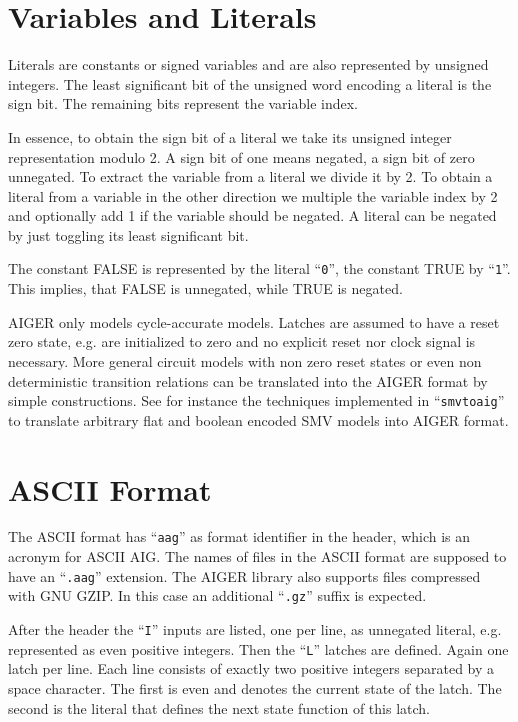 \documentclass[10pt]{llncs}
\begin{document}
\section{Variables and Literals}

  Literals are constants or signed variables and are also represented by
  unsigned integers.  The least significant bit of the unsigned word
  encoding a literal is the sign bit.  The remaining bits represent the
  variable index.
  
  In essence, to obtain the sign bit of a literal we take its unsigned
  integer representation modulo 2.  A sign bit of one means negated, a sign
  bit of zero unnegated.  To extract the variable from a literal we divide
  it by 2.  To obtain a literal from a variable in the other direction we
  multiple the variable index by 2 and optionally add 1 if the variable
  should be negated.   A literal can be negated by just toggling its least
  significant bit.
  
  The constant FALSE is represented by the literal ``\texttt{0}'', the constant TRUE by
  ``\texttt{1}''.  This implies, that FALSE is unnegated, while TRUE is negated.

  AIGER only models cycle-accurate models.  Latches are assumed to have a
  reset zero state, e.g. are initialized to zero and no explicit reset nor
  clock signal is necessary.  More general circuit models with non zero
  reset states or even non deterministic transition relations can be
  translated into the AIGER format by simple constructions.  See for
  instance the techniques implemented in ``\texttt{smvtoaig}'' to translate 
  arbitrary flat and boolean encoded SMV models into AIGER format.

\section{ASCII Format}
  
  The ASCII format has ``\texttt{aag}'' as format identifier in the header, which is an
  acronym for ASCII AIG.  The names of files in the ASCII format are
  supposed to have an ``\texttt{.aag}''  extension.  The AIGER library also supports
  files compressed with GNU GZIP.  In this case an additional ``\texttt{.gz}'' suffix
  is expected.

  After the header the ``\texttt{I}'' inputs are listed, one per line, as unnegated
  literal, e.g.  represented as even positive integers.  Then the ``\texttt{L}''
  latches are defined.  Again one latch per line.  Each line consists of
  exactly two positive integers separated by a space character.  The first
  is even and denotes the current state of the latch. The second is the
  literal that defines the next state function of this latch.  
  
\end{document}
